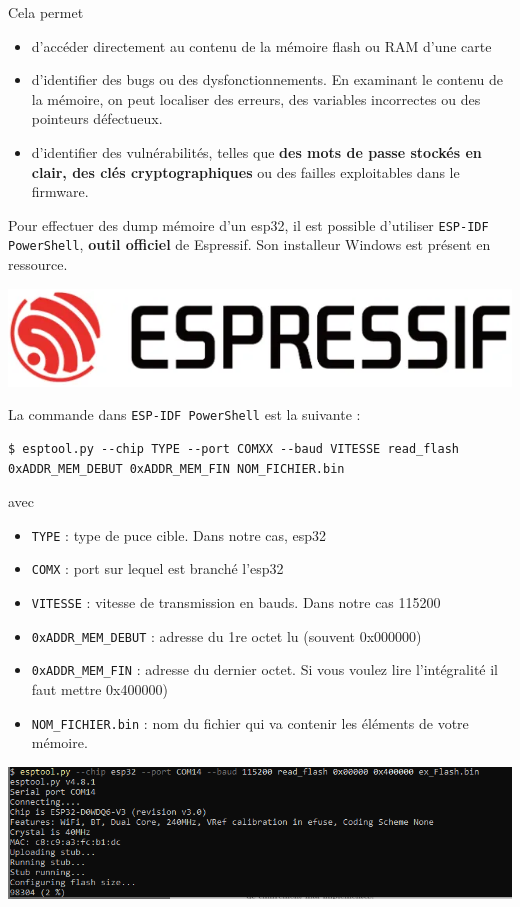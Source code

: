 \documentclass[french, 12pt]{article}%
\newcommand{\itemE}{\item[$\bullet$]}
\newif\ifPROF
\begin{document}
Cela permet 
\begin{itemize}
\itemE d'accéder directement au contenu de la mémoire flash ou RAM d'une carte
\itemE d'identifier des bugs ou des dysfonctionnements. En examinant le contenu de la mémoire, on peut localiser des erreurs, des variables incorrectes ou des pointeurs défectueux.
\itemE d'identifier des vulnérabilités, telles que \textbf{des mots de passe stockés en clair, des clés cryptographiques} ou des failles exploitables dans le firmware.
\end{itemize}

Pour effectuer des dump mémoire d'un esp32, il est possible d'utiliser \verb?ESP-IDF PowerShell?, \textbf{outil officiel} de Espressif. Son installeur Windows est présent en ressource. 

\begin{center}
\includegraphics[scale=0.5]{./ressource/esp_idf.png}
\end{center}

La commande dans \verb?ESP-IDF PowerShell? est la suivante : 
\begin{lstlisting}[style=commande]
$ esptool.py --chip TYPE --port COMXX --baud VITESSE read_flash 0xADDR_MEM_DEBUT 0xADDR_MEM_FIN NOM_FICHIER.bin
\end{lstlisting}
avec
\begin{itemize}
\itemE \verb?TYPE? : type de puce cible. Dans notre cas, esp32
\itemE \verb?COMX? : port sur lequel est branché l'esp32
\itemE \verb?VITESSE? : vitesse de transmission en bauds. Dans notre cas 115200
\itemE \verb?0xADDR_MEM_DEBUT? : adresse du 1re octet lu (souvent 0x000000)
\itemE \verb?0xADDR_MEM_FIN? : adresse du dernier octet. Si vous voulez lire l'intégralité il faut mettre 0x400000)
\itemE \verb?NOM_FICHIER.bin? : nom du fichier qui va contenir les éléments de votre mémoire.
\end{itemize}


\ifPROF
\color{red}
Commande pour dump
\verb? esptool.py --chip esp32 --port COM14 --baud 115200 read_flash 0x00000 0x400000 full_flash.bin?
\normalcolor
\fi

\begin{center}
\includegraphics[scale=0.7]{./ressource/esptool}
\end{center}
\end{document}
